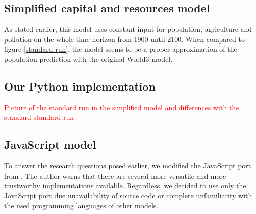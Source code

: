 \documentclass[10pt,a4paper]{scrartcl}
\begin{document}
\subsection*{Simplified capital and resources model}

As stated earlier, this model uses constant input for population, agriculture and pollution on the whole time horizon from 1900 until 2100. When compared to figure \ref{standard-run}, the model seems to be a proper approximation of the population prediction with the original World3 model.

\subsection*{Our Python implementation}

\textcolor{red}{Picture of the standard run in the simplified model and differences with the standard standard run}

\subsection*{JavaScript model}

To answer the research questions posed earlier, we modified the JavaScript port from \cite{blogpost}. The author warns that there are several more versatile and more trustworthy implementations available. Regardless, we decided to use only the JavaScript port due unavailability of source code or complete unfamiliarity with the used programming languages of other models.
\end{document}

